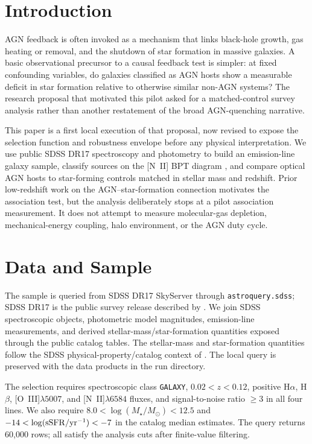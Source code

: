 \documentclass[twocolumn]{aastex631}
\begin{document}
\section{Introduction}\label{sec:intro}
AGN feedback is often invoked as a mechanism that links black-hole growth, gas heating or removal, and the shutdown of star formation in massive galaxies.  A basic observational precursor to a causal feedback test is simpler: at fixed confounding variables, do galaxies classified as AGN hosts show a measurable deficit in star formation relative to otherwise similar non-AGN systems?  The research proposal that motivated this pilot asked for a matched-control survey analysis rather than another restatement of the broad AGN-quenching narrative.

This paper is a first local execution of that proposal, now revised to expose the selection function and robustness envelope before any physical interpretation.  We use public SDSS DR17 spectroscopy and photometry \citep{abdurrouf2022} to build an emission-line galaxy sample, classify sources on the [N~II] BPT diagram \citep{baldwin1981,kewley2001,kauffmann2003,kewley2006}, and compare optical AGN hosts to star-forming controls matched in stellar mass and redshift.  Prior low-redshift work on the AGN--star-formation connection \citep{lamassa2013} motivates the association test, but the analysis deliberately stops at a pilot association measurement.  It does not attempt to measure molecular-gas depletion, mechanical-energy coupling, halo environment, or the AGN duty cycle.

\section{Data and Sample}\label{sec:data}
The sample is queried from SDSS DR17 SkyServer through \texttt{astroquery.sdss}; SDSS DR17 is the public survey release described by \citet{abdurrouf2022}.  We join SDSS spectroscopic objects, photometric model magnitudes, emission-line measurements, and derived stellar-mass/star-formation quantities exposed through the public catalog tables.  The stellar-mass and star-formation quantities follow the SDSS physical-property/catalog context of \citet{brinchmann2004}.  The local query is preserved with the data products in the run directory.

The selection requires spectroscopic class \texttt{GALAXY}, $0.02<z<0.12$, positive H$\alpha$, H$\beta$, [O~III]$\lambda5007$, and [N~II]$\lambda6584$ fluxes, and signal-to-noise ratio $\geq3$ in all four lines.  We also require $8.0 < \log(M_\star/M_\odot) < 12.5$ and $-14 < \log({\rm sSFR}/{\rm yr}^{-1}) < -7$ in the catalog median estimates.  The query returns 60,000 rows; all satisfy the analysis cuts after finite-value filtering.
\end{document}
